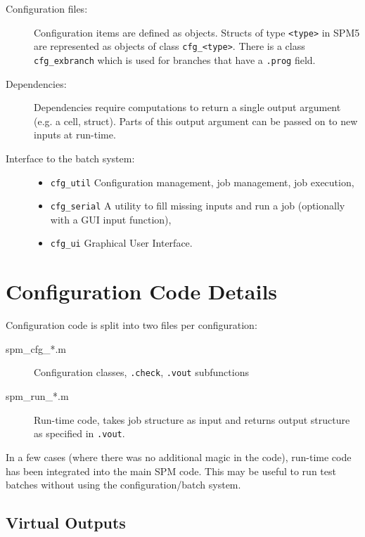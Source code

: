 \begin{description}

\item[Configuration files:] Configuration items are defined as objects.
  Structs of type \verb|<type>| in SPM5 are represented as
  objects of class \verb|cfg_<type>|. There is a class
  \verb|cfg_exbranch| which is used for branches that have a \verb|.prog|
  field.
  
\item[Dependencies:] Dependencies require computations to return a single output 
  argument (e.g. a cell, struct). Parts of this output argument can be passed
  on to new inputs at run-time.
  
\item[Interface to the batch system:]
  \begin{itemize}
  \item \verb|cfg_util| Configuration management, job management, job execution,
  \item \verb|cfg_serial| A utility to fill missing inputs and run a job
    (optionally with a GUI input function),
  \item \verb|cfg_ui| Graphical User Interface.
  \end{itemize}

\end{description}

\section{Configuration Code Details}

Configuration code is split into two files per configuration:
\begin{description}
\item[spm\_cfg\_*.m] Configuration classes, \verb|.check|, \verb|.vout|
  subfunctions
\item[spm\_run\_*.m] Run-time code, takes job structure as input and returns
  output structure as specified in \verb|.vout|.
\end{description}
In a few cases (where there was no additional magic in the code), run-time
code has been integrated into the main SPM code. This may be useful to run
test batches without using the configuration/batch system.

\subsection{Virtual Outputs}

